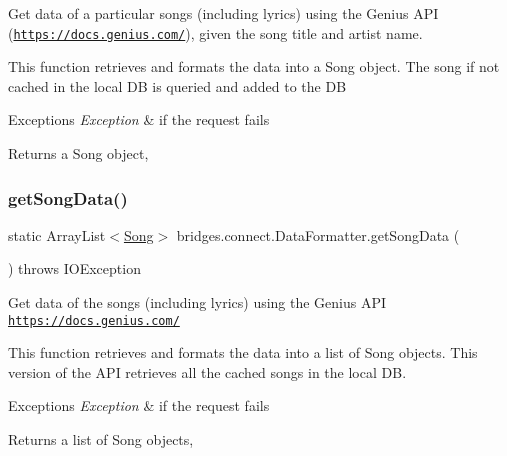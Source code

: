 Get data of a particular songs (including lyrics) using the Genius A\+PI (\href{https://docs.genius.com/}{\tt https\+://docs.\+genius.\+com/}), given the song title and artist name.

This function retrieves and formats the data into a Song object. The song if not cached in the local DB is queried and added to the DB


\begin{DoxyExceptions}{Exceptions}
{\em Exception} & if the request fails\\
\hline
\end{DoxyExceptions}
\begin{DoxyReturn}{Returns}
a Song object, 
\end{DoxyReturn}
\mbox{\label{classbridges_1_1connect_1_1_data_formatter_a6a2ded4ccec11234434b83a3e408fb67}} 
\subsubsection{\texorpdfstring{get\+Song\+Data()}{getSongData()}}
{\footnotesize\ttfamily static Array\+List$<$\hyperlink{classbridges_1_1data__src__dependent_1_1_song}{Song}$>$ bridges.\+connect.\+Data\+Formatter.\+get\+Song\+Data (\begin{DoxyParamCaption}{ }\end{DoxyParamCaption}) throws I\+O\+Exception\hspace{0.3cm}{\ttfamily [static]}}

Get data of the songs (including lyrics) using the Genius A\+PI \href{https://docs.genius.com/}{\tt https\+://docs.\+genius.\+com/}

This function retrieves and formats the data into a list of Song objects. This version of the A\+PI retrieves all the cached songs in the local DB.


\begin{DoxyExceptions}{Exceptions}
{\em Exception} & if the request fails\\
\hline
\end{DoxyExceptions}
\begin{DoxyReturn}{Returns}
a list of Song objects, 
\end{DoxyReturn}
\mbox{\label{classbridges_1_1connect_1_1_data_formatter_a7359d12ccbda0ea57de4c0ec14f9732b}} 
